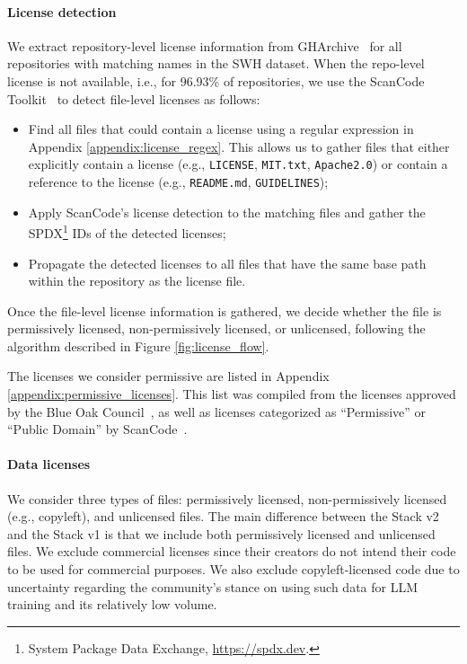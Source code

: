 \documentclass[10pt]{article} %
\begin{document}
\paragraph{License detection} 
We extract repository-level license information from GHArchive~\citep{gharchive} for all repositories with matching names in the SWH dataset. When the repo-level license is not available, i.e., for 96.93\% of repositories, we use the ScanCode Toolkit~\citep{scancode} to detect file-level licenses as follows:
\begin{itemize}
    \item Find all files that could contain a license using a regular expression in Appendix \ref{appendix:license_regex}. This allows us to gather files that either explicitly contain a license (e.g., \verb|LICENSE|, \verb|MIT.txt|, \verb|Apache2.0|) or contain a reference to the license (e.g., \verb|README.md|, \verb|GUIDELINES|);
    \item Apply ScanCode's license detection to the matching files and gather the SPDX\footnote{System Package Data Exchange, \url{https://spdx.dev}.} IDs of the detected licenses;
    \item Propagate the detected licenses to all files that have the same base path within the repository as the license file. 
\end{itemize}
Once the file-level license information is gathered, we decide whether the file is permissively licensed, non-permissively licensed, or unlicensed, following the algorithm described in Figure \ref{fig:license_flow}. 

The licenses we consider permissive are listed in Appendix  \ref{appendix:permissive_licenses}. This list was compiled from the licenses approved by the Blue Oak Council~\citep{blueoak_list}, as well as licenses categorized as ``Permissive'' or ``Public Domain'' by ScanCode~\citep{scancode_license_categories}. 

\paragraph{Data licenses} 
We consider three types of files: permissively licensed, non-permissively licensed (e.g., copyleft), and unlicensed files. The main difference between the Stack v2 and the Stack v1 is that we include both permissively licensed and unlicensed files. We exclude commercial licenses since their creators do not intend their code to be used for commercial purposes. We also exclude copyleft-licensed code due to uncertainty regarding the community's stance on using such data for LLM training and its relatively low volume. 
\end{document}
